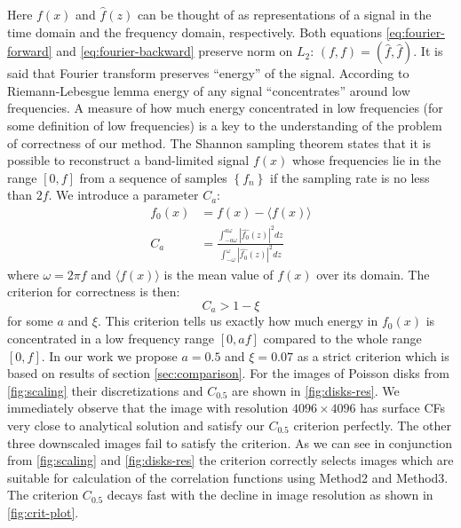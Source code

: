 \documentclass[reprint,amsmath,amssymb,aps,pre]{revtex4-1}
\begin{document}
Here $f(x)$ and $\hat{f}(z)$ can be thought of as representations of a signal in
the time domain and the frequency domain, respectively. Both equations
\cref{eq:fourier-forward} and \cref{eq:fourier-backward} preserve norm on $L_2$:
$(f, f) = (\hat{f}, \hat{f})$. It is said that Fourier transform preserves
``energy'' of the signal. According to Riemann-Lebesgue lemma \cite{bookHilb}
energy of any signal ``concentrates'' around low frequencies. A measure of how
much energy concentrated in low frequencies (for some definition of low
frequencies) is a key to the understanding of the problem of correctness of our
method. The Shannon sampling theorem \cite{bookHilb} states that it is possible
to reconstruct a band-limited signal $f(x)$ whose frequencies lie in the range
$[0, f]$ from a sequence of samples $\left\{f_n\right\}$ if the sampling rate is
no less than $2f$. We introduce a parameter $C_a$:
\begin{align*}
  f_0(x) &= f(x) - \langle f(x) \rangle \\
  C_a &= \frac{\int_{-a\omega}^{a\omega} |\hat{f_0}(z)|^2 dz}{\int_{-\omega}^{\omega} |\hat{f_0}(z)|^2 dz}
\end{align*}
where $\omega = 2\pi f$ and $\langle f(x) \rangle$ is the mean value of $f(x)$
over its domain. The criterion for correctness is then:
\begin{equation*}
  C_a > 1 - \xi
\end{equation*}
for some $a$ and $\xi$. This criterion tells us exactly how much energy in
$f_0(x)$ is concentrated in a low frequency range $[0, af]$ compared to the
whole range $[0, f]$. In our work we propose $a = 0.5$ and $\xi = 0.07$ as
a strict criterion which is based on results of section
\cref{sec:comparison}. For the images of Poisson disks from \cref{fig:scaling}
their discretizations and $C_{0.5}$ are shown in \cref{fig:disks-res}. We
immediately observe that the image with resolution $4096 \times 4096$ has
surface CFs very close to analytical solution and satisfy our  $C_{0.5}$
criterion perfectly. The other three downscaled images fail to satisfy the
criterion. As we can see in conjunction from \cref{fig:scaling} and
\cref{fig:disks-res} the criterion correctly selects images which are suitable
for calculation of the correlation functions using Method2 and Method3. The
criterion $C_{0.5}$ decays fast with the decline in image resolution as shown in
\cref{fig:crit-plot}.
\end{document}

